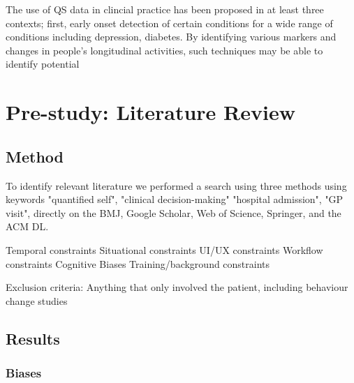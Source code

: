 \documentclass{sigchi}
\begin{document}
The use of QS data in clincial practice has been proposed in at least three contexts; first, early onset detection of certain conditions for a wide range of conditions including depression, diabetes. By identifying various markers and changes in people's longitudinal activities, such techniques may be able to identify potential 

\section{Pre-study: Literature Review} 

\subsection{Method}
To identify relevant literature we performed a search using three methods using keywords "quantified self", "clinical decision-making" "hospital admission", "GP visit", directly on the BMJ, Google Scholar, Web of Science, Springer, and the ACM DL.

Temporal constraints
Situational constraints
UI/UX constraints 
Workflow constraints
Cognitive Biases
Training/background constraints

Exclusion criteria:
  Anything that only involved the patient, including behaviour change studies

\subsection{Results}

\subsubsection{Biases}







\end{document}
